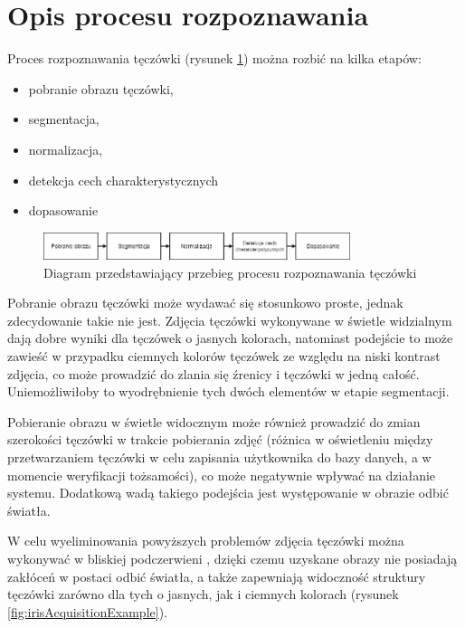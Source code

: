 \section{Opis procesu rozpoznawania}

\noindent
Proces rozpoznawania tęczówki (rysunek \ref{fig:processDiagram}) można rozbi\'c na kilka etapów:

\begin{itemize}
  \item pobranie obrazu tęczówki,
  \item segmentacja,
  \item normalizacja,
  \item detekcja cech charakterystycznych
  \item dopasowanie
\end{itemize}

\begin{figure}[ht]
  \centering
  \includegraphics[width=0.8\textwidth]{images/intro/processDiagram.png}
  \caption{Diagram przedstawiający przebieg procesu rozpoznawania tęczówki}
  \label{fig:processDiagram}
\end{figure}

Pobranie obrazu tęczówki może wydawa\'c się stosunkowo proste, jednak zdecydowanie takie nie
jest. Zdjęcia tęczówki wykonywane w świetle widzialnym dają dobre wyniki dla tęczówek o jasnych
kolorach, natomiast podejście to może zawieś\'c w przypadku ciemnych kolorów tęczówek ze względu
na niski kontrast zdjęcia, co może prowadzi\'c do zlania się \'zrenicy i tęczówki w jedną całoś\'c.
Uniemożliwiłoby to wyodrębnienie tych dwóch elementów w etapie segmentacji.

Pobieranie obrazu w świetle widocznym może również prowadzi\'c do zmian szerokości tęczówki w trakcie
pobierania zdję\'c (różnica w oświetleniu między przetwarzaniem tęczówki w celu zapisania użytkownika
do bazy danych, a w momencie weryfikacji tożsamości), co może negatywnie wpływa\'c na działanie
systemu. Dodatkową wadą takiego podejścia jest występowanie w obrazie odbi\'c światła.

W celu wyeliminowania powyższych problemów zdjęcia tęczówki można wykonywa\'c w bliskiej podczerwieni \cite{IrisRecognitionPresentation},
dzięki czemu uzyskane obrazy nie posiadają zakłóceń w postaci odbi\'c światła, a także
zapewniają widocznoś\'c struktury tęczówki zarówno dla tych o jasnych, jak i ciemnych kolorach (rysunek \ref{fig:irisAcquisitionExample}).

